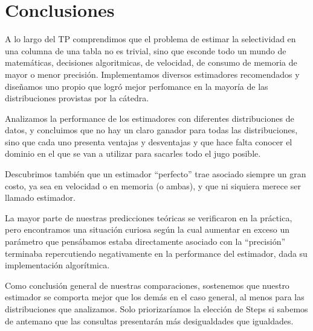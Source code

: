 \section{Conclusiones}
A lo largo del TP comprendimos que el problema de estimar la selectividad en una columna de una tabla no es trivial, sino que esconde todo un mundo de matemáticas, decisiones algoritmicas, de velocidad, de consumo de memoria de mayor o menor precisión. Implementamos diversos estimadores recomendados y diseñamos uno propio que logró mejor perfomance en la mayoría de las distribuciones provistas por la cátedra.

Analizamos la performance de los estimadores con diferentes distribuciones de datos, y concluimos que no hay un claro ganador para todas las distribuciones, sino que cada uno presenta ventajas y desventajas y que hace falta conocer el dominio en el que se van a utilizar para sacarles todo el jugo posible.

Descubrimos también que un estimador ``perfecto'' trae asociado siempre un gran costo, ya sea en velocidad o en memoria (o ambas), y que ni siquiera merece ser llamado estimador.

La mayor parte de nuestras predicciones teóricas se verificaron en la práctica, pero encontramos una situación curiosa según la cual aumentar en exceso un parámetro que pensábamos estaba directamente asociado con la ``precisión'' terminaba repercutiendo negativamente en la performance del estimador, dada su implementación algorítmica.

Como conclusión general de nuestras comparaciones, sostenemos que nuestro estimador se comporta mejor que los demás en el caso general, al menos para las distribuciones que analizamos. Solo priorizaríamos la elección de Steps si sabemos de antemano que las consultas presentarán más desigualdades que igualdades.